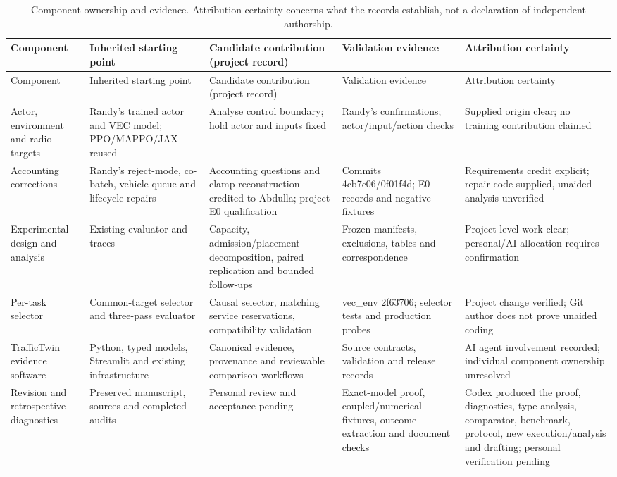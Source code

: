 \documentclass[11pt,a4paper]{article}
\begin{document}
\begingroup
\small
\begin{xltabular}{\textwidth}{@{}YYYYY@{}}
\caption{Component ownership and evidence. Attribution certainty concerns what the records establish, not a declaration of independent authorship.}\label{tab:11} \\
\toprule
Component & Inherited starting point & Candidate contribution (project record) & Validation evidence & Attribution certainty \\
\midrule\endfirsthead
\toprule
Component & Inherited starting point & Candidate contribution (project record) & Validation evidence & Attribution certainty \\
\midrule\endhead
\bottomrule\endfoot
Actor, environment and radio targets & Randy's trained actor and VEC model; PPO/MAPPO/JAX reused & Analyse control boundary; hold actor and inputs fixed & Randy's confirmations; actor/input/action checks & Supplied origin clear; no training contribution claimed \\
Accounting corrections & Randy's reject-mode, co-batch, vehicle-queue and lifecycle repairs & Accounting questions and clamp reconstruction credited to Abdulla; project E0 qualification & Commits 4cb7c06/0f01f4d; E0 records and negative fixtures & Requirements credit explicit; repair code supplied, unaided analysis unverified \\
Experimental design and analysis & Existing evaluator and traces & Capacity, admission/placement decomposition, paired replication and bounded follow-ups & Frozen manifests, exclusions, tables and correspondence & Project-level work clear; personal/AI allocation requires confirmation \\
Per-task selector & Common-target selector and three-pass evaluator & Causal selector, matching service reservations, compatibility validation & vec\_env 2f63706; selector tests and production probes & Project change verified; Git author does not prove unaided coding \\
TrafficTwin evidence software & Python, typed models, Streamlit and existing infrastructure & Canonical evidence, provenance and reviewable comparison workflows & Source contracts, validation and release records & AI agent involvement recorded; individual component ownership unresolved \\
Revision and retrospective diagnostics & Preserved manuscript, sources and completed audits & Personal review and acceptance pending & Exact-model proof, coupled/numerical fixtures, outcome extraction and document checks & Codex produced the proof, diagnostics, type analysis, comparator, benchmark, protocol, new execution/analysis and drafting; personal verification pending \\
\end{xltabular}
\endgroup
\end{document}
